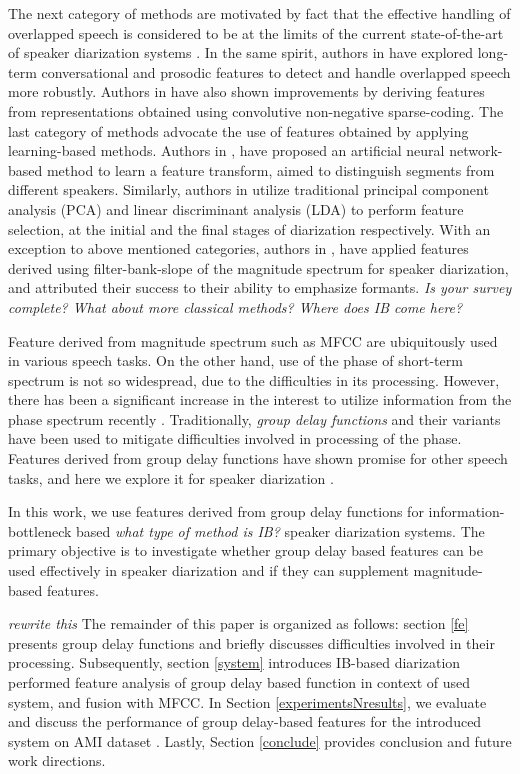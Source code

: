 \documentclass[conference]{IEEEtran}
\begin{document}
The next category of methods are motivated by fact that the effective handling of
overlapped speech is considered to be at the limits of the current 
state-of-the-art of speaker diarization systems \cite{reviewPaper1,featOverLap}. In the same
spirit, authors in \cite{featProsody,featOverLap} have explored long-term
conversational and prosodic features to detect and handle overlapped speech more
robustly. Authors in \cite{featSC} have also shown improvements by deriving
features from representations obtained using convolutive non-negative
sparse-coding. The last category of methods advocate the use of features
obtained by applying learning-based methods. Authors in \cite{featANN}, have
proposed an artificial neural network-based method to learn a feature transform,
aimed to distinguish segments from different speakers. Similarly, authors in
\cite{featPCAnLDA} utilize traditional principal component analysis (PCA) and
linear discriminant analysis (LDA) to perform feature selection, at the initial
and the final stages of diarization respectively. With an exception to
above mentioned categories, authors in \cite{featFilterBank}, have applied
features derived using filter-bank-slope of the magnitude spectrum for speaker
diarization, and attributed their success to their ability to emphasize
formants. \textit{Is your survey complete? What about more classical methods?
Where does IB come here?}

Feature derived from magnitude spectrum such as MFCC are ubiquitously used in various
speech tasks. On the other hand, use of the phase of short-term spectrum is not so
widespread, due to the difficulties in its processing.
However, there has been a significant increase in the interest to utilize
information from the phase spectrum recently
\cite{phaseImportantInterspeech14,gdSurvey}. Traditionally, \textit{group delay functions}
and their variants have been used to mitigate difficulties involved in
processing of the phase. Features derived from
group delay functions have shown promise for other speech tasks, and here we 
explore it for speaker diarization \cite{modifiedGD,allPoleGdSid}. 

In this work, we use features derived from group delay functions for
information-bottleneck based \textit{what type of method is IB?} 
speaker diarization systems. The primary objective
is to investigate whether group delay based features can be used
effectively in speaker diarization and if they can supplement magnitude-based
features.

\textit{rewrite this}
The remainder of this paper is organized as follows: section \ref{fe} presents
group delay functions and briefly discusses difficulties involved in their
processing. Subsequently, section \ref{system} introduces IB-based diarization
performed feature analysis of group delay based
function in context of used system, and fusion with MFCC. In Section
\ref{experimentsNresults}, we evaluate and discuss the performance of group
delay-based features for the introduced system on AMI dataset \cite{AMIData}.
Lastly, Section \ref{conclude} provides conclusion and future work directions.    
\end{document}
